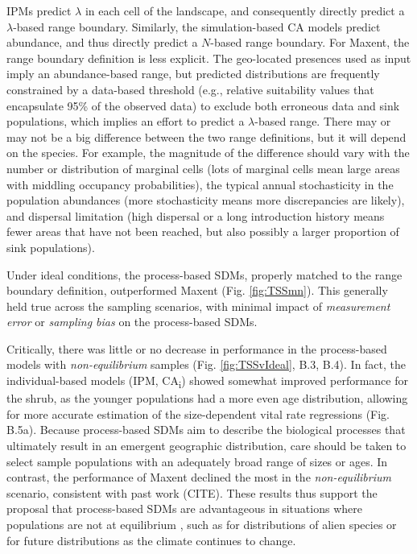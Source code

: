 \documentclass[preprint,review,times,12pt]{elsarticle}
\begin{document}
IPMs predict $\lambda$ in each cell of the landscape, and consequently directly predict a $\lambda$-based range boundary. Similarly, the simulation-based CA models predict abundance, and thus directly predict a $N$-based range boundary. For Maxent, the range boundary definition is less explicit. The geo-located presences used as input imply an abundance-based range, but predicted distributions are frequently constrained by a data-based threshold (e.g., relative suitability values that encapsulate 95\% of the observed data) to exclude both erroneous data and sink populations, which implies an effort to predict a $\lambda$-based range. There may or may not be a big difference between the two range definitions, but it will depend on the species. For example, the magnitude of the difference should vary with the number or distribution of marginal cells (lots of marginal cells mean large areas with middling occupancy probabilities), the typical annual stochasticity in the population abundances (more stochasticity means more discrepancies are likely), and dispersal limitation (high dispersal or a long introduction history means fewer areas that have not been reached, but also possibly a larger proportion of sink populations). 

Under ideal conditions, the process-based SDMs, properly matched to the range boundary definition, outperformed Maxent (Fig. \ref{fig:TSSmn}). This generally held true across the sampling scenarios, with minimal impact of \emph{measurement error} or \emph{sampling bias} on the process-based SDMs. 

Critically, there was little or no decrease in performance in the process-based models with \emph{non-equilibrium} samples (Fig. \ref{fig:TSSvIdeal}, B.3, B.4). In fact, the individual-based models (IPM, CA\textsubscript{i}) showed somewhat improved performance for the shrub, as the younger populations had a more even age distribution, allowing for more accurate estimation of the size-dependent vital rate regressions (Fig. B.5a). Because process-based SDMs aim to describe the biological processes that ultimately result in an emergent geographic distribution, care should be taken to select sample populations with an adequately broad range of sizes or ages. In contrast, the performance of Maxent declined the most in the \emph{non-equilibrium} scenario, consistent with past work (CITE). These results thus support the proposal that process-based SDMs are advantageous in situations where populations are not at equilibrium \citep{Merow2011a,Evans2016,Merow2017,Cabral2017}, such as for distributions of alien species or for future distributions as the climate continues to change. 
\end{document}

